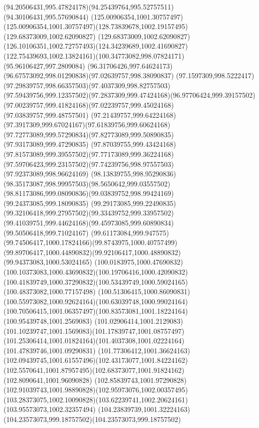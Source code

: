 {{	\curveto(94.20506431,995.47824178)(94.25439764,995.52757511)(94.30106431,995.57690844)
	\lineto(125.00906354,1001.30757497)
	\curveto(125.00906354,1001.30757497)(128.73839678,1002.19157495)(129.68373009,1002.62090827)
	\curveto(129.68373009,1002.62090827)(126.10106351,1002.72757493)(124.34239689,1002.41690827)
	\curveto(122.75439693,1002.13824161)(100.34773082,998.07824171)(95.96106427,997.2809084)
	\curveto(96.31706426,997.64624173)(96.67573092,998.01290838)(97.02639757,998.38090837)
	\curveto(97.1597309,998.5222417)(97.29839757,998.66357503)(97.4037309,998.82757503)
	\curveto(97.59439756,999.12357502)(97.2837309,999.47424168)(96.97706424,999.39157502)
	\curveto(97.00239757,999.41824168)(97.02239757,999.45024168)(97.03839757,999.48757501)
	\curveto(97.21439757,999.64224168)(97.3917309,999.67024167)(97.61839756,999.60624168)
	\curveto(97.72773089,999.57290834)(97.82773089,999.50890835)(97.93173089,999.47290835)
	\curveto(97.87039755,999.43424168)(97.81573089,999.39557502)(97.77173089,999.36224168)
	\curveto(97.59706423,999.23157502)(97.74239756,998.97557503)(97.92373089,998.96624169)
	\curveto(98.13839755,998.95290836)(98.35173087,998.99957503)(98.5650642,999.03557502)
	\curveto(98.81173086,999.08090836)(99.03839752,998.99424169)(99.24373085,999.18090835)
	\curveto(99.29173085,999.22490835)(99.32106418,999.27957502)(99.33439752,999.33957502)
	\curveto(99.41039751,999.44624168)(99.45973085,999.60890834)(99.50506418,999.71024167)
	\curveto(99.61173084,999.947575)(99.74506417,1000.17824166)(99.8743975,1000.40757499)
	\curveto(99.89706417,1000.44890832)(99.92106417,1000.48890832)(99.94373083,1000.53024165)
	\curveto(100.0183975,1000.47690832)(100.10373083,1000.43690832)(100.19706416,1000.42090832)
	\curveto(100.41839749,1000.37290832)(100.53439749,1000.59024165)(100.48373082,1000.77157498)
	\curveto(100.51306415,1000.86090831)(100.55973082,1000.92624164)(100.63039748,1000.99024164)
	\curveto(100.70506415,1001.06357497)(100.83573081,1001.18224164)(100.95439748,1001.2569083)
	\curveto(101.02906414,1001.2129083)(101.10239747,1001.1569083)(101.17839747,1001.08757497)
	\curveto(101.25306414,1001.01824164)(101.4037308,1001.02224164)(101.47839746,1001.09290831)
	\curveto(101.77306412,1001.36624163)(102.09439745,1001.61557496)(102.43173077,1001.84224162)
	\curveto(102.5570641,1001.87957495)(102.68373077,1001.91824162)(102.8090641,1001.96090828)
	\curveto(102.85839743,1001.97290828)(102.91039743,1001.98890828)(102.95973076,1002.00357495)
	\curveto(103.28373075,1002.10090828)(103.62239741,1002.20624161)(103.95573073,1002.32357494)
	\curveto(104.23839739,1001.32224163)(104.23573073,999.18757502)(104.23573073,999.18757502)
}}
